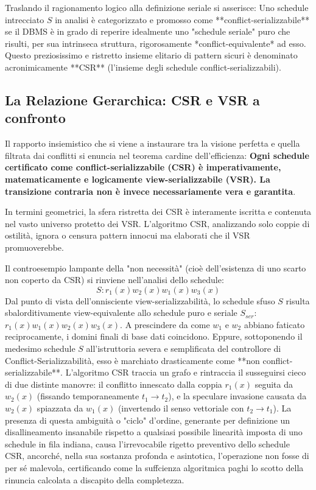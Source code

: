 Traslando il ragionamento logico alla definizione seriale si asserisce:
Uno schedule intrecciato $S$ in analisi è categorizzato e promosso come **conflict-serializzabile** se il DBMS è in grado di reperire idealmente uno "schedule seriale" puro che risulti, per sua intrinseca struttura, rigorosamente *conflict-equivalente* ad esso.
Questo preziosissimo e ristretto insieme elitario di pattern sicuri è denominato acronimicamente **CSR** (l'insieme degli schedule conflict-serializzabili).

\subsection{La Relazione Gerarchica: CSR e VSR a confronto}
Il rapporto insiemistico che si viene a instaurare tra la visione perfetta e quella filtrata dai conflitti si enuncia nel teorema cardine dell'efficienza:
\textbf{Ogni schedule certificato come conflict-serializzabile (CSR) è imperativamente, matematicamente e logicamente view-serializzabile (VSR). La transizione contraria non è invece necessariamente vera e garantita}.

In termini geometrici, la sfera ristretta dei CSR è interamente iscritta e contenuta nel vasto universo protetto dei VSR. L'algoritmo CSR, analizzando solo coppie di ostilità, ignora o censura pattern innocui ma elaborati che il VSR promuoverebbe.

Il controesempio lampante della "non necessità" (cioè dell'esistenza di uno scarto non coperto da CSR) si rinviene nell'analisi dello schedule:
$$S: r_1(x) w_2(x) w_1(x) w_3(x)$$
Dal punto di vista dell'onnisciente view-serializzabilità, lo schedule sfuso $S$ risulta sbalorditivamente view-equivalente allo schedule puro e seriale $S_{ser}$: $r_1(x) w_1(x) w_2(x) w_3(x)$. A prescindere da come $w_1$ e $w_2$ abbiano faticato reciprocamente, i domini finali di base dati coincidono.
Eppure, sottoponendo il medesimo schedule $S$ all'istruttoria severa e semplificata del controllore di Conflict-Serializzabilità, esso è marchiato drasticamente come **non conflict-serializzabile**. L'algoritmo CSR traccia un grafo e rintraccia il susseguirsi cieco di due distinte manovre: il conflitto innescato dalla coppia $r_1(x)$ seguita da $w_2(x)$ (fissando temporaneamente $t_1 \to t_2$), e la speculare invasione causata da $w_2(x)$ spiazzata da $w_1(x)$ (invertendo il senso vettoriale con $t_2 \to t_1$). La presenza di questa ambiguità o "ciclo" d'ordine, generante per definizione un disallineamento insanabile rispetto a qualsiasi possibile linearità imposta di uno schedule in fila indiana, causa l'irrevocabile rigetto preventivo dello schedule CSR, ancorché, nella sua sostanza profonda e asintotica, l'operazione non fosse di per sé malevola, certificando come la suffcienza algoritmica paghi lo scotto della rinuncia calcolata a discapito della completezza.
